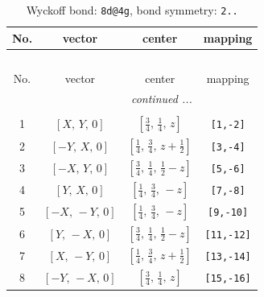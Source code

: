 \documentclass[fleqn,8pt]{jsarticle}
\begin{document}
\begin{longtable}{cccc}
\caption{Wyckoff bond: {\tt 8d@4g}, bond symmetry: {\tt 2..}}
 \\
 \hline \hline
No. & vector & center & mapping \\ \hline \endfirsthead

\multicolumn{3}{l}{\tablename\ \thetable{}} \\
 \hline \hline
No. & vector & center & mapping \\ \hline \endhead

 \hline \hline
\multicolumn{3}{r}{\footnotesize\it continued ...} \\ \endfoot

 \hline \hline
\multicolumn{3}{r}{} \\ \endlastfoot

1 & $\left[ X,\, Y,\, 0 \right]$ & $\left[ \frac{3}{4},\, \frac{1}{4},\, z \right]$ & {\tt [1,-2]} \\ \hline
2 & $\left[ - Y,\, X,\, 0 \right]$ & $\left[ \frac{1}{4},\, \frac{3}{4},\, z + \frac{1}{2} \right]$ & {\tt [3,-4]} \\ \hline
3 & $\left[ - X,\, Y,\, 0 \right]$ & $\left[ \frac{3}{4},\, \frac{1}{4},\, \frac{1}{2} - z \right]$ & {\tt [5,-6]} \\ \hline
4 & $\left[ Y,\, X,\, 0 \right]$ & $\left[ \frac{1}{4},\, \frac{3}{4},\, - z \right]$ & {\tt [7,-8]} \\ \hline
5 & $\left[ - X,\, - Y,\, 0 \right]$ & $\left[ \frac{1}{4},\, \frac{3}{4},\, - z \right]$ & {\tt [9,-10]} \\ \hline
6 & $\left[ Y,\, - X,\, 0 \right]$ & $\left[ \frac{3}{4},\, \frac{1}{4},\, \frac{1}{2} - z \right]$ & {\tt [11,-12]} \\ \hline
7 & $\left[ X,\, - Y,\, 0 \right]$ & $\left[ \frac{1}{4},\, \frac{3}{4},\, z + \frac{1}{2} \right]$ & {\tt [13,-14]} \\ \hline
8 & $\left[ - Y,\, - X,\, 0 \right]$ & $\left[ \frac{3}{4},\, \frac{1}{4},\, z \right]$ & {\tt [15,-16]} \\
\end{longtable}
\renewcommand{\arraystretch}{1.2}
\end{document}
